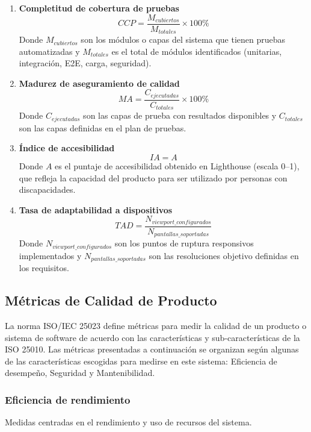 \begin{enumerate}
    \item \textbf{Completitud de cobertura de pruebas}
          \[
              CCP = \frac{M_{cubiertos}}{M_{totales}} \times 100\%
          \]
          Donde \(M_{cubiertos}\) son los módulos o capas del sistema que tienen pruebas automatizadas y \(M_{totales}\) es el total de módulos identificados (unitarias, integración, E2E, carga, seguridad).

    \item \textbf{Madurez de aseguramiento de calidad}
          \[
              MA = \frac{C_{ejecutadas}}{C_{totales}} \times 100\%
          \]
          Donde \(C_{ejecutadas}\) son las capas de prueba con resultados disponibles y \(C_{totales}\) son las capas definidas en el plan de pruebas.

    \item \textbf{Índice de accesibilidad}
          \[
              IA = A
          \]
          Donde \(A\) es el puntaje de accesibilidad obtenido en Lighthouse (escala 0--1), que refleja la capacidad del producto para ser utilizado por personas con discapacidades.

    \item \textbf{Tasa de adaptabilidad a dispositivos}
          \[
              TAD = \frac{N_{viewport\_configurados}}{N_{pantallas\_soportadas}}
          \]
          Donde \(N_{viewport\_configurados}\) son los puntos de ruptura responsivos implementados y \(N_{pantallas\_soportadas}\) son las resoluciones objetivo definidas en los requisitos.
\end{enumerate}
\subsection{Métricas de Calidad de Producto}
La norma ISO/IEC 25023 define métricas para medir la calidad de un producto o sistema de software de acuerdo con las características y sub-características de la ISO 25010. Las métricas presentadas a continuación se organizan según algunas de las características escogidas para medirse en este sistema: Eficiencia de desempeño, Seguridad y Mantenibilidad.

\subsubsection{Eficiencia de rendimiento}

Medidas centradas en el rendimiento y uso de recursos del sistema.

